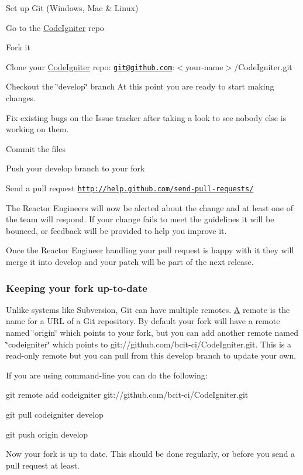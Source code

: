 \begin{DoxyEnumerate}
\item Set up Git (Windows, Mac \& Linux)
\item Go to the \mbox{\hyperlink{namespace_code_igniter}{Code\+Igniter}} repo
\item Fork it
\item Clone your \mbox{\hyperlink{namespace_code_igniter}{Code\+Igniter}} repo\+: \href{mailto:git@github.com}{\tt git@github.\+com}\+:$<$your-\/name$>$/\+Code\+Igniter.git
\item Checkout the \char`\"{}develop\char`\"{} branch At this point you are ready to start making changes.
\item Fix existing bugs on the Issue tracker after taking a look to see nobody else is working on them.
\item Commit the files
\item Push your develop branch to your fork
\item Send a pull request \href{http://help.github.com/send-pull-requests/}{\tt http\+://help.\+github.\+com/send-\/pull-\/requests/}
\end{DoxyEnumerate}

The Reactor Engineers will now be alerted about the change and at least one of the team will respond. If your change fails to meet the guidelines it will be bounced, or feedback will be provided to help you improve it.

Once the Reactor Engineer handling your pull request is happy with it they will merge it into develop and your patch will be part of the next release.

\subsubsection*{Keeping your fork up-\/to-\/date}

Unlike systems like Subversion, Git can have multiple remotes. \mbox{\hyperlink{class_a}{A}} remote is the name for a U\+RL of a Git repository. By default your fork will have a remote named \char`\"{}origin\char`\"{} which points to your fork, but you can add another remote named \char`\"{}codeigniter\char`\"{} which points to {\ttfamily git\+://github.com/bcit-\/ci/\+Code\+Igniter.\+git}. This is a read-\/only remote but you can pull from this develop branch to update your own.

If you are using command-\/line you can do the following\+:


\begin{DoxyEnumerate}
\item {\ttfamily git remote add codeigniter git\+://github.com/bcit-\/ci/\+Code\+Igniter.\+git}
\item {\ttfamily git pull codeigniter develop}
\item {\ttfamily git push origin develop}
\end{DoxyEnumerate}

Now your fork is up to date. This should be done regularly, or before you send a pull request at least. 
